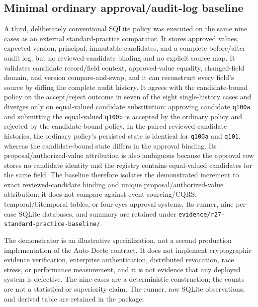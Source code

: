 \documentclass[preprint,12pt,authoryear]{elsarticle}
\newcommand{\code}[1]{\nolinkurl{#1}}
\begin{document}
\subsection{Minimal ordinary approval/audit-log baseline}
\label{app:approval-log-baseline}

A third, deliberately conventional SQLite policy was executed on the same nine
cases as an external standard-practice comparator. It stores approved values,
expected version, principal, immutable candidates, and a complete before/after
audit log, but no reviewed-candidate binding and no explicit source map. It
validates candidate record/field context, approved-value equality,
changed-field domain, and version compare-and-swap, and it can reconstruct every
field's source by diffing the complete audit history. It agrees with the
candidate-bound policy on the accept/reject outcome in seven of the eight
single-history cases and diverges only on equal-valued candidate substitution:
approving candidate \code{q100a} and submitting the equal-valued \code{q100b}
is accepted by the ordinary policy and rejected by the candidate-bound policy.
In the paired reviewed-candidate histories, the ordinary policy's persisted
state is identical for \code{q100a} and \code{q101}, whereas the
candidate-bound state differs in the approval binding. Its
proposal/authorized-value attribution is also ambiguous because the approval row
stores no candidate identity and the registry contains equal-valued candidates
for the same field. The baseline therefore isolates the demonstrated increment
to exact reviewed-candidate binding and unique proposal/authorized-value
attribution; it does not compare against event-sourcing/CQRS,
temporal/bitemporal tables, or four-eyes approval systems. Its runner, nine
per-case SQLite databases, and summary are retained under
\code{evidence/r27-standard-practice-baseline/}.

The demonstrator is an illustrative specialization, not a second production
implementation of the Auto-Decte contract. It does not implement cryptographic
evidence verification, enterprise authentication, distributed revocation, race
stress, or performance measurement, and it is not evidence that any deployed
system is defective. The nine cases are a deterministic construction; the
counts are not a statistical or superiority claim. The runner, raw SQLite
observations, and derived table are retained in the package.
\end{document}
